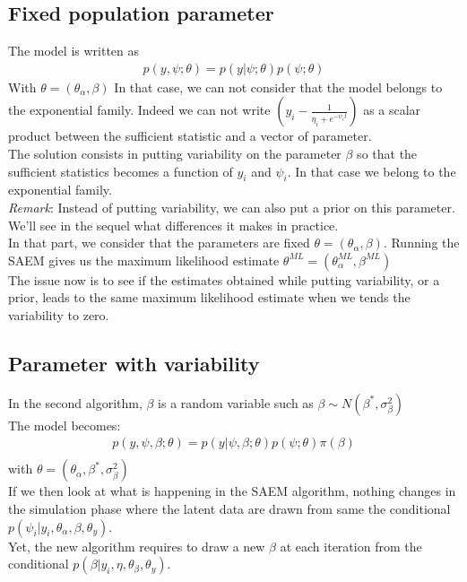 \documentclass[a4paper]{article}
\begin{document}
\subsection{Fixed population parameter}
The model is written as 
\begin{align}
 p(y,\psi;\theta) = p(y|\psi;\theta)p(\psi;\theta)
\end{align}
With $\theta = (\theta_{\alpha}, \beta)$
In that case, we can not consider that the model belongs to the exponential family. Indeed we can not write $(y_i - \frac{1}{\eta_i+e^{-\psi_i t}})$ as a scalar product between the sufficient statistic and a vector of parameter.\\
The solution consists in putting variability on the parameter $\beta$ so that the sufficient statistics becomes a function of $y_i$ and $\psi_i$. In that case we belong to the exponential family.\\
\textit{Remark}: Instead of putting variability, we can also put a prior on this parameter. We'll see in the sequel what differences it makes in practice.\\
In that part, we consider that the parameters are fixed $\theta =(\theta_{\alpha}, \beta)$. Running the SAEM gives us the maximum likelihood estimate $\theta^{ML} =(\theta_{\alpha}^{ML}, \beta^{ML})$\\

The issue now is to see if the estimates obtained while putting variability, or a prior, leads to the same maximum likelihood estimate when we tends the variability to zero.


\subsection{Parameter with variability}
In the second algorithm, $\beta$ is a random variable such as $\beta \sim N(\beta^{*},\sigma_{\beta}^2)$\\
The model becomes:
\begin{align}
 p(y,\psi,\beta;\theta) = p(y|\psi,\beta;\theta)p(\psi;\theta)\pi(\beta)\\
\end{align}
with $\theta = (\theta_{\alpha}, \beta^*, \sigma_{\beta}^2)$\\


If we then look at what is happening in the SAEM algorithm, nothing changes in the simulation phase where the latent data are drawn from same the conditional $p(\psi_i|y_i, \theta_{\alpha}, \beta, \theta_y)$.\\
Yet, the new algorithm requires to draw a new $\beta$ at each iteration from the conditional $p(\beta| y_i,\eta,\theta_{\beta},\theta_y)$.\\
\end{document}
